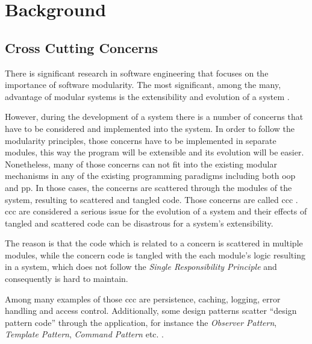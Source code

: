 
\chapter{Background}\label{Background}

\section{Cross Cutting Concerns}\label{Cross Cutting Concerns}
There is significant research in software engineering that focuses on the importance of software modularity. 
The most significant, among the many, advantage of modular systems is the extensibility and evolution of a system \cite{parnas1972criteria}.

However, during the development of a system there is a number of concerns that have to be considered and implemented into the system. 
In order to follow the modularity principles, those concerns have to be implemented in separate modules, this way the program will be extensible and its evolution will be easier.
Nonetheless, many of those concerns can not fit into the existing modular mechanisms in any of the existing programming paradigms including both \acrlong{oop} and \acrlong{pp}. 
In those cases, the concerns are scattered through the modules of the system, resulting to scattered and tangled code. 
Those concerns are called \acrlong{ccc} \cite{hannemann2005role}.
\ac{ccc} are considered a serious issue for the evolution of a system and their effects of tangled and scattered code can be disastrous for a system's extensibility.

The reason is that the code which is related to a concern is scattered in multiple modules, while the concern code is tangled with the each module's logic resulting in a system, which does not follow the \textit{Single Responsibility Principle} and consequently is hard to maintain.

Among many examples of those \ac{ccc} are persistence, caching, logging, error handling \cite{lippert2000study} and access control. 
Additionally, some design patterns scatter ``design pattern code'' through the application, for instance the \textit{Observer Pattern}, \textit{Template Pattern}, \textit{Command Pattern} etc. \cite{hannemann2002design} \cite{marin2004refactoring}.

